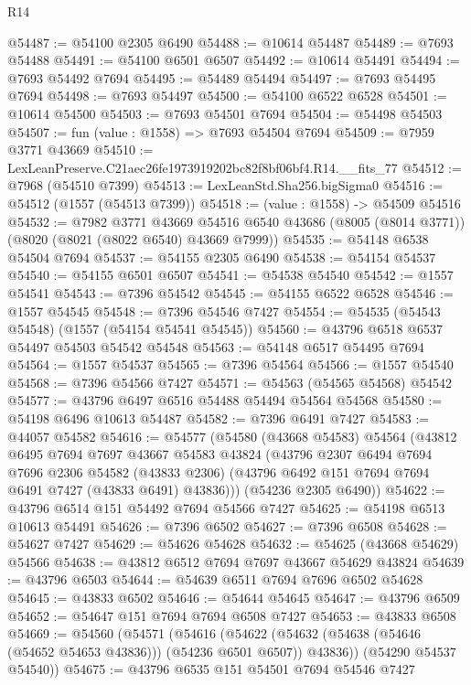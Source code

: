 \begin{lexlean}{R14}
\begin{coremodule}
@54487 := @54100 @2305 @6490
@54488 := @10614 @54487
@54489 := @7693 @54488
@54491 := @54100 @6501 @6507
@54492 := @10614 @54491
@54494 := @7693 @54492 @7694
@54495 := @54489 @54494
@54497 := @7693 @54495 @7694
@54498 := @7693 @54497
@54500 := @54100 @6522 @6528
@54501 := @10614 @54500
@54503 := @7693 @54501 @7694
@54504 := @54498 @54503
@54507 := fun (value : @1558) => @7693 @54504 @7694
@54509 := @7959 @3771 @43669
@54510 := LexLeanPreserve.C21aec26fe1973919202bc82f8bf06bf4.R14.__fits_77
@54512 := @7968 (@54510 @7399)
@54513 := LexLeanStd.Sha256.bigSigma0
@54516 := @54512 (@1557 (@54513 @7399))
@54518 := (value : @1558) -> @54509 @54516
@54532 := @7982
    @3771
    @43669
    @54516
    @6540
    @43686
    (@8005 (@8014 @3771))
    (@8020 (@8021 (@8022 @6540) @43669 @7999))
@54535 := @54148 @6538 @54504 @7694
@54537 := @54155 @2305 @6490
@54538 := @54154 @54537
@54540 := @54155 @6501 @6507
@54541 := @54538 @54540
@54542 := @1557 @54541
@54543 := @7396 @54542
@54545 := @54155 @6522 @6528
@54546 := @1557 @54545
@54548 := @7396 @54546 @7427
@54554 := @54535 (@54543 @54548) (@1557 (@54154 @54541 @54545))
@54560 := @43796 @6518 @6537 @54497 @54503 @54542 @54548
@54563 := @54148 @6517 @54495 @7694
@54564 := @1557 @54537
@54565 := @7396 @54564
@54566 := @1557 @54540
@54568 := @7396 @54566 @7427
@54571 := @54563 (@54565 @54568) @54542
@54577 := @43796 @6497 @6516 @54488 @54494 @54564 @54568
@54580 := @54198 @6496 @10613 @54487
@54582 := @7396 @6491 @7427
@54583 := @44057 @54582
@54616 := @54577
    (@54580
      (@43668 @54583)
      @54564
      (@43812
        @6495
        @7694
        @7697
        @43667
        @54583
        @43824
        (@43796
          @2307
          @6494
          @7694
          @7696
          @2306
          @54582
          (@43833 @2306)
          (@43796 @6492 @151 @7694 @7694 @6491 @7427 (@43833 @6491) @43836)))
      (@54236 @2305 @6490))
@54622 := @43796 @6514 @151 @54492 @7694 @54566 @7427
@54625 := @54198 @6513 @10613 @54491
@54626 := @7396 @6502
@54627 := @7396 @6508
@54628 := @54627 @7427
@54629 := @54626 @54628
@54632 := @54625 (@43668 @54629) @54566
@54638 := @43812 @6512 @7694 @7697 @43667 @54629 @43824
@54639 := @43796 @6503
@54644 := @54639 @6511 @7694 @7696 @6502 @54628
@54645 := @43833 @6502
@54646 := @54644 @54645
@54647 := @43796 @6509
@54652 := @54647 @151 @7694 @7694 @6508 @7427
@54653 := @43833 @6508
@54669 := @54560
    (@54571
      (@54616
        (@54622 (@54632 (@54638 (@54646 (@54652 @54653 @43836))) (@54236 @6501 @6507)) @43836))
      (@54290 @54537 @54540))
@54675 := @43796 @6535 @151 @54501 @7694 @54546 @7427

\end{coremodule}
\end{lexlean}
